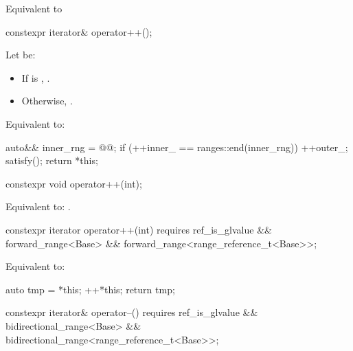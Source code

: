 \begin{itemdescr}
\pnum
\effects
Equivalent to 
\end{itemdescr}

%
\begin{itemdecl}
constexpr iterator& operator++();
\end{itemdecl}

\begin{itemdescr}
\pnum
Let  be:
\begin{itemize}
\item If  is , .
\item Otherwise, .
\end{itemize}

\pnum
\effects
Equivalent to:
\begin{codeblock}
auto&& inner_rng = @@;
if (++inner_ == ranges::end(inner_rng)) {
  ++outer_;
  satisfy();
}
return *this;
\end{codeblock}
\end{itemdescr}

%
\begin{itemdecl}
constexpr void operator++(int);
\end{itemdecl}

\begin{itemdescr}
\pnum
\effects
Equivalent to: .
\end{itemdescr}

%
\begin{itemdecl}
constexpr iterator operator++(int)
  requires ref_is_glvalue && forward_range<Base> &&
           forward_range<range_reference_t<Base>>;
\end{itemdecl}

\begin{itemdescr}
\pnum
\effects
Equivalent to:
\begin{codeblock}
auto tmp = *this;
++*this;
return tmp;
\end{codeblock}
\end{itemdescr}

%
\begin{itemdecl}
constexpr iterator& operator--()
  requires ref_is_glvalue && bidirectional_range<Base> &&
           bidirectional_range<range_reference_t<Base>>;
\end{itemdecl}

